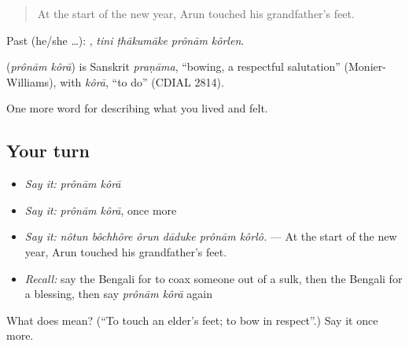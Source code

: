 \begin{quote}
At the start of the new year, Arun touched his grandfather's feet.
\end{quote}

Past (he/she …):    , \emph{tini ṭhākumāke prônām kôrlen}.

\begin{cousinweb}
\textbf{ } (\emph{prônām kôrā}) is Sanskrit \emph{praṇāma}, \textquotedblleft{}bowing, a respectful salutation\textquotedblright{} (Monier-Williams), with \emph{kôrā}, \textquotedblleft{}to do\textquotedblright{} (CDIAL 2814).
\end{cousinweb}

\begin{grammarlens}[title={What you've built}]
One more word for describing what you lived and felt.
\end{grammarlens}

\subsection*{Your turn}
\begin{itemize}
\raggedright
  \item \emph{Say it:} \emph{prônām kôrā}
  \item \emph{Say it:} \emph{prônām kôrā}, once more
  \item \emph{Say it:} \emph{nôtun bôchhôre ôrun dāduke prônām kôrlô.} — At the start of the new year, Arun touched his grandfather's feet.
  \item \emph{Recall:} say the Bengali for to coax someone out of a sulk, then the Bengali for a blessing, then say \emph{prônām kôrā} again
\end{itemize}

\begin{tcolorbox}[breakable,colback=teal!4,colframe=teal!35!black,title={Before you move on}]
What does   mean? (\textquotedblleft{}To touch an elder's feet; to bow in respect\textquotedblright{}.) Say it once more.
\end{tcolorbox}
